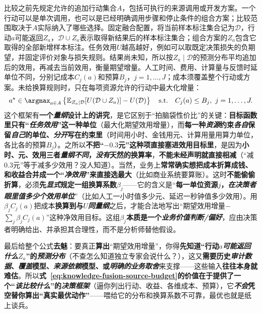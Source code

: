 比较之前先规定允许的追加行动集合$A$，包括可执行的来源调用或开发方案。一个行动可以是单次调用，也可以是已经明确调用步骤和停止条件的组合方案；比较范围取决于$A$实际纳入了哪些选择。固定融合配置，将当前样本标注集合记为$\mathcal{D}$，行动$a$可能返回$Z_a$，$\mathcal{D}\cup Z_a$表示取得新结果后的样本标注集合；组合方案的$Z_a$包含它取得的全部新增样本标注。任务效用$U$越高越好，例如可以取既定决策损失的负期望，并固定评价对象与损失规则。结果尚未知，所以按$Z_a\mid\mathcal{D}$的预测分布平均追加后的效用，再减去当前效用，衡量期望增量。人工时间、费用、计算量与反馈时延单位不同，分别记成本$C_j(a)$和预算$B_j$，$j=1,\ldots,J$；成本须覆盖整个行动或方案。未给换算规则时，只在每项资源允许的行动中最大化增量：
\begin{equation}
  a^\star
  \in\argmax_{a\in A}
  \left\{
    \mathbb{E}_{Z_a\mid\mathcal{D}}
    [U(\mathcal{D}\cup Z_a)]
    -U(\mathcal{D})
  \right\}
  \quad
  \text{s.t.}\quad
  C_j(a)\leq B_j,\ j=1,\ldots,J.
  \label{eq:knowledge-fusion-source-budget}
\end{equation}
这个框架有\textbf{一个\emph{量纲}设计上的讲究}，是它区别于“拍脑袋性价比”的关键：\textbf{目标函数里只有“\emph{任务效用}”这一种单位}（最大化期望效用增量），而\textbf{每一种\emph{资源}约束\emph{各自}保留\emph{自己}的单位、\emph{分开}写在约束里}（时间用小时、金钱用元、计算用量用算力单位，各比各的预算$B_j$）。之所以\textbf{不把“$-0.3$元”这种项直接塞进效用目标里}，是因为\textbf{小时、元、效用}\textbf{三者\emph{量纲不同}，\emph{没有}天然的换算率}，\textbf{不能未经声明就直接相减}（“减0.3元”等于减多少效用？没人知道）。当然，业务上\textbf{常常确实想把成本折算成钱、和收益合并成一个“\emph{净效用}”来直接选最大}（比如商业系统要算账）。这时\textbf{不能偷偷折算}，必须\textbf{先\emph{显式}规定一组换算系数}$\beta_j$——它的含义是“\textbf{每一单位资源$j$，\emph{在决策者眼里值多少个效用单位}}”（比如人工一小时值多少元、延迟一秒钟值多少效用）。用$\beta_jC_j(a)$把成本\textbf{换算到与$U$\emph{同量纲}}之后，才能合法地写出“期望效用增量$-$$\sum_j\beta_jC_j(a)$”这种净效用目标。这组$\beta_j$\textbf{本质是一个\emph{业务价值判断/偏好}}，应由决策者明确给出、并承担其合理性，而不是分析师替他假设。

最后给整个公式\textbf{去魅}：要真正\textbf{算出}“期望效用增量”，你得\textbf{先知道“行动$a$\emph{可能返回什么}$Z_a$”的\emph{预测分布}}（不查怎么知道独立专家会说什么？），这又\textbf{需要历史\emph{审计数据}、\emph{覆盖}模型、\emph{来源依赖}模型、或\emph{明确的业务取舍}}来支撑——这些输入\textbf{往往本身就难估}。所以\textbf{式~\eqref{eq:knowledge-fusion-source-budget}的价值在于提供了一个“\emph{该\emph{比较什么}}”的\emph{决策框架}}（逼你列出行动、收益、各维成本、预算），它\textbf{\emph{不会}凭空替你算出“真实最优动作”}——喂给它的分布和换算系数不可靠，最优也就是纸上谈兵。

